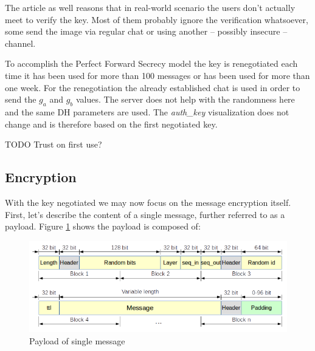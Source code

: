 \documentclass[thesis=M,english]{FITthesis}[2012/10/20]
\begin{document}
The article as well reasons that in real-world scenario the users don't actually meet to verify the key. Most of them probably ignore the verification whatsoever, some send the image via regular chat or using another -- possibly insecure -- channel.

To accomplish the Perfect Forward Secrecy model the key is renegotiated each time it has been used for more than 100 messages or has been used for more than one week. For the renegotiation the already established chat is used in order to send the $g_a$ and $g_b$ values. The server does not help with the randomness here and the same DH parameters are used. The \emph{auth\_key} visualization does not change and is therefore based on the first negotiated key.

TODO Trust on first use?


\subsection{Encryption}\label{telegram-enc}

With the key negotiated we may now focus on the message encryption itself. First, let's describe the content of a single message, further referred to as a payload. Figure \ref{img:telegram-payload} shows the payload is composed \cite{telegram-aarhus} of:


\begin{figure}[htb]
	\centering
	\includegraphics[width=1\textwidth]{telegram-payload.png}
	\caption{Payload of single message \cite{telegram-aarhus}}
	\label{img:telegram-payload}
\end{figure}
\end{document}
